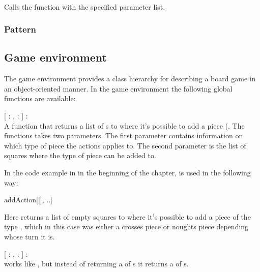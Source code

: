 \begin{dlist}
  \item {}\\
    Calls the function with the specified parameter list. 
\end{dlist}

\subsubsection{Pattern}

\subsection{Game environment}
\label{sec:gameenvironment}

The game environment provides a class hierarchy for describing a board game in an object-oriented manner.
In the game environment the following global functions are available:

\begin{dlist}
  \item {}[ : ,  : ] : \\
    A function that returns a list of s to where it's possible to add a piece (. The functions
    takes two parameters. The first parameter contains information on which type of piece the actions applies to. The second parameter is
    the list of squares where the type of piece can be added to.
    
    In the code example in  in the beginning of the chapter,  is used in the following
    way: \\
    \begin{center}
    {addAction}[[], ..]
    \end{center}
    
    Here  returns a list of empty squares to where it's possible to add a piece of the type , which in this case was
    either a crosses piece or noughts piece depending whose turn it is.
    
  \item {}[ : ,  : ] : \\
   works like , but instead of returning a  of s it returns a  of s.
  	
    
\end{dlist}



